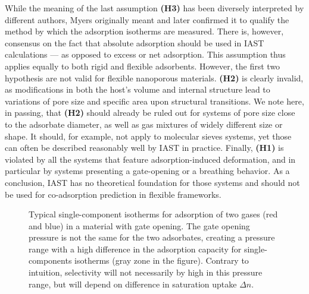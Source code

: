 \documentclass[thesis]{subfiles}
\begin{document}
While the meaning of the last assumption \textbf{(H3)} has been diversely
interpreted by different authors, Myers\cite{Myers1965} originally meant and
later confirmed\cite{Myers2014} it to qualify the method by which the adsorption
isotherms are measured. There is, however, consensus on the fact that absolute
adsorption should be used in IAST calculations --- as opposed to excess or net
adsorption\cite{Brandani2016}. This assumption thus applies equally to both
rigid and flexible adsorbents. However, the first two hypothesis are not valid
for flexible nanoporous materials. \textbf{(H2)} is clearly invalid, as
modifications in both the host's volume and internal structure lead to
variations of pore size and specific area upon structural transitions. We note
here, in passing, that \textbf{(H2)} should already be ruled out for systems of
pore size close to the adsorbate diameter, as well as gas mixtures of widely
different size or shape.  It should, for example, not apply to molecular sieves
systems, yet those can often be described reasonably well by IAST in practice.
Finally, \textbf{(H1)} is violated by all the systems that feature
adsorption-induced deformation, and in particular by systems presenting a
gate-opening or a breathing behavior. As a conclusion, IAST has no theoretical
foundation for those systems and should not be used for co-adsorption prediction
in flexible frameworks.

\begin{figure}[htp]
    \centering
    
    \caption{Typical single-component isotherms for adsorption of two gases (red
    and blue) in a material with gate opening. The gate opening pressure is not
    the same for the two adsorbates, creating a pressure range with a high
    difference in the adsorption capacity for single-components isotherms (gray
    zone in the figure). Contrary to intuition, selectivity will not necessarily
    by high in this pressure range, but will depend on difference in saturation
    uptake $\Delta n$.}
    \label{fig:open-close-selectivity}
\end{figure}
\end{document}
